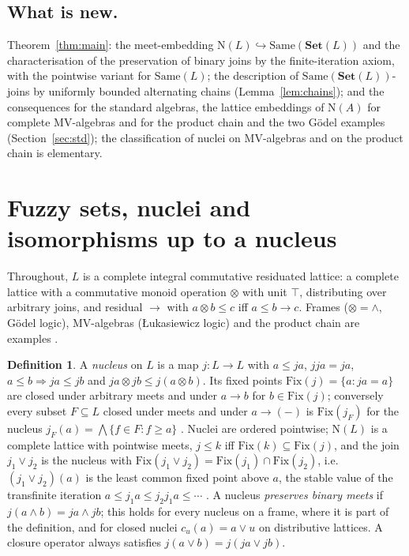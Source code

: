 \documentclass[11pt]{amsart}
\theoremstyle{definition}
\newtheorem{defi}[thm]{Definition}
\newcommand{\Fix}{\mathrm{Fix}}
\newcommand{\Nuc}{\mathrm{N}}
\newcommand{\Same}{\mathrm{Same}}
\newcommand{\FSet}{\mathbf{Set}}
\begin{document}
\subsection*{What is new.}
Theorem~\ref{thm:main}: the meet-embedding $\Nuc(L)\hookrightarrow
\Same(\FSet(L))$ and the characterisation of the preservation of binary
joins by the finite-iteration axiom, with the pointwise variant for
$\Same(L)$; the description of $\Same(\FSet(L))$-joins by uniformly bounded
alternating chains (Lemma~\ref{lem:chains}); and the consequences for the
standard algebras, the lattice embeddings of $\Nuc(A)$ for complete
MV-algebras and for the product chain and the two G\"odel examples
(Section~\ref{sec:std}); the classification of nuclei on MV-algebras and on
the product chain is elementary.

\section{Fuzzy sets, nuclei and isomorphisms up to a nucleus}\label{sec:prelim}

Throughout, $L$ is a complete integral commutative residuated lattice: a
complete lattice with a commutative monoid operation $\otimes$ with unit
$\top$, distributing over arbitrary joins, and residual $\to$ with
$a\otimes b\le c$ iff $a\le b\to c$. Frames ($\otimes=\wedge$, G\"odel
logic), MV-algebras (\L ukasiewicz logic) and the product chain are
examples \cite{Hajek}.

\begin{defi}
A \emph{nucleus} on $L$ is a map $j\colon L\to L$ with $a\le ja$,
$jja=ja$, $a\le b\Rightarrow ja\le jb$ and $ja\otimes jb\le j(a\otimes b)$.
Its fixed points $\Fix(j)=\{a:ja=a\}$ are closed under arbitrary meets and
under $a\to b$ for $b\in\Fix(j)$; conversely every subset $F\subseteq L$
closed under meets and under $a\to(-)$ is $\Fix(j_F)$ for the nucleus
$j_F(a)=\bigwedge\{f\in F:f\ge a\}$ \cite{Rosenthal,GJKO}. Nuclei are
ordered pointwise; $\Nuc(L)$ is a complete lattice with pointwise meets,
$j\le k$ iff $\Fix(k)\subseteq\Fix(j)$, and the join $j_1\vee j_2$ is the
nucleus with $\Fix(j_1\vee j_2)=\Fix(j_1)\cap\Fix(j_2)$, i.e.\
$(j_1\vee j_2)(a)$ is the least common fixed point above $a$, the stable
value of the transfinite iteration $a\le j_1a\le j_2j_1a\le\cdots$
\cite{Macnab,Escardo}. A nucleus \emph{preserves binary meets} if
$j(a\wedge b)=ja\wedge jb$; this holds for every nucleus on a frame, where it
is part of the definition, and for closed nuclei $c_u(a)=a\vee u$ on
distributive lattices. A closure operator always satisfies
$j(a\vee b)=j(ja\vee jb)$.
\end{defi}
\end{document}
